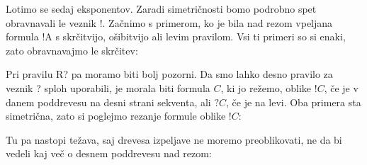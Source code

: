 \dol
\begin{prooftree}

\end{prooftree}
Lotimo se sedaj eksponentov. Zaradi simetričnosti bomo podrobno spet obravnavali le veznik !. Začnimo s primerom, ko je bila nad rezom vpeljana formula !A s skrčitvijo, ošibitvijo ali levim pravilom. Vsi ti primeri so si enaki, zato obravnavajmo le skrčitev:
\begin{prooftree}

\end{prooftree}
\dol
\begin{prooftree}
\end{prooftree}
Pri pravilu R? pa moramo biti bolj pozorni. Da smo lahko desno pravilo za veznik ? sploh uporabili, je morala biti formula $C$, ki jo režemo, oblike $!C$, če je v danem poddrevesu na desni strani sekventa, ali $?C$, če je na levi. Oba primera sta simetrična, zato si poglejmo rezanje formule oblike $!C$:
\begin{prooftree}

\end{prooftree}
Tu pa nastopi težava, saj drevesa izpeljave ne moremo preoblikovati, ne da bi vedeli kaj več o desnem poddrevesu nad rezom:
\begin{prooftree}
\end{prooftree}
